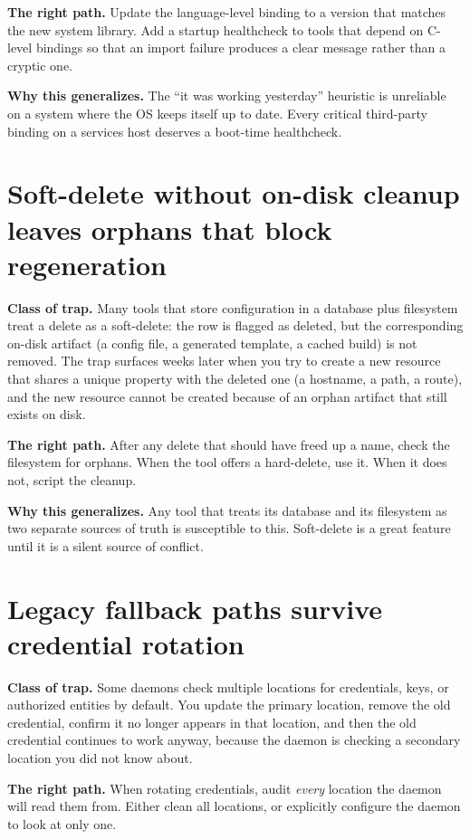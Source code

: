 \documentclass[12pt]{article}
\begin{document}
\textbf{The right path.} Update the language-level binding to a version that matches the new system library. Add a startup healthcheck to tools that depend on C-level bindings so that an import failure produces a clear message rather than a cryptic one.

\textbf{Why this generalizes.} The ``it was working yesterday'' heuristic is unreliable on a system where the OS keeps itself up to date. Every critical third-party binding on a services host deserves a boot-time healthcheck.

\section{Soft-delete without on-disk cleanup leaves orphans that block regeneration}

\textbf{Class of trap.} Many tools that store configuration in a database plus filesystem treat a delete as a soft-delete: the row is flagged as deleted, but the corresponding on-disk artifact (a config file, a generated template, a cached build) is not removed. The trap surfaces weeks later when you try to create a new resource that shares a unique property with the deleted one (a hostname, a path, a route), and the new resource cannot be created because of an orphan artifact that still exists on disk.

\textbf{The right path.} After any delete that should have freed up a name, check the filesystem for orphans. When the tool offers a hard-delete, use it. When it does not, script the cleanup.

\textbf{Why this generalizes.} Any tool that treats its database and its filesystem as two separate sources of truth is susceptible to this. Soft-delete is a great feature until it is a silent source of conflict.

\section{Legacy fallback paths survive credential rotation}

\textbf{Class of trap.} Some daemons check multiple locations for credentials, keys, or authorized entities by default. You update the primary location, remove the old credential, confirm it no longer appears in that location, and then the old credential continues to work anyway, because the daemon is checking a secondary location you did not know about.

\textbf{The right path.} When rotating credentials, audit \emph{every} location the daemon will read them from. Either clean all locations, or explicitly configure the daemon to look at only one.
\end{document}
